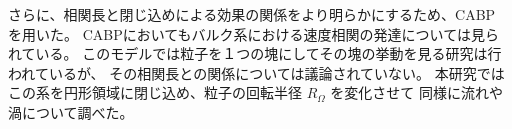 \documentclass[/Users/ikedahajime/GitHub/reserch/master_report/thesis]{subfiles}
\begin{document}
さらに、相関長と閉じ込めによる効果の関係をより明らかにするため、CABP を用いた。
CABPにおいてもバルク系における速度相関の発達については見られている\cite{kurodaLongrangeTranslationalOrder2024}。
このモデルでは粒子を１つの塊にしてその塊の挙動を見る研究は行われている\cite{capriniSelfrevertingVorticesChiral2024}が、
その相関長との関係については議論されていない。
本研究ではこの系を円形領域に閉じ込め、粒子の回転半径 $R_\Omega$ を変化させて
同様に流れや渦について調べた。
\end{document}
